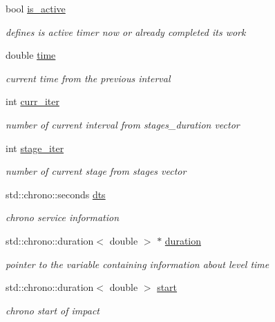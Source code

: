 \begin{DoxyCompactItemize}
bool \hyperlink{class_timer_a6f1066d49764f5fc746f5fd669d95a9f}{is\+\_\+active}
\begin{DoxyCompactList}\small\item\em defines is active timer now or already completed its work \end{DoxyCompactList}\item 
\mbox{\label{class_timer_aa410e9f94d1cdb79090fcf159f8f4d8c}} 
double \hyperlink{class_timer_aa410e9f94d1cdb79090fcf159f8f4d8c}{time}
\begin{DoxyCompactList}\small\item\em current time from the previous interval \end{DoxyCompactList}\item 
\mbox{\label{class_timer_ae5b386341474f4cb8f11227e884250ab}} 
int \hyperlink{class_timer_ae5b386341474f4cb8f11227e884250ab}{curr\+\_\+iter}
\begin{DoxyCompactList}\small\item\em number of current interval from stages\+\_\+duration vector \end{DoxyCompactList}\item 
\mbox{\label{class_timer_a34caee928e5a02b075496a74329abaeb}} 
int \hyperlink{class_timer_a34caee928e5a02b075496a74329abaeb}{stage\+\_\+iter}
\begin{DoxyCompactList}\small\item\em number of current stage from stages vector \end{DoxyCompactList}\item 
\mbox{\label{class_timer_a196651dd936adea933d014145a9ae38e}} 
std\+::chrono\+::seconds \hyperlink{class_timer_a196651dd936adea933d014145a9ae38e}{dts}
\begin{DoxyCompactList}\small\item\em chrono service information \end{DoxyCompactList}\item 
\mbox{\label{class_timer_adbfe2ce4f502d555df6468e551a00f93}} 
std\+::chrono\+::duration$<$ double $>$ $\ast$ \hyperlink{class_timer_adbfe2ce4f502d555df6468e551a00f93}{duration}
\begin{DoxyCompactList}\small\item\em pointer to the variable containing information about level time \end{DoxyCompactList}\item 
\mbox{\label{class_timer_a9ad79c94db842e09125f74e776fa784a}} 
std\+::chrono\+::duration$<$ double $>$ \hyperlink{class_timer_a9ad79c94db842e09125f74e776fa784a}{start}
\begin{DoxyCompactList}\small\item\em chrono start of impact \end{DoxyCompactList}\end{DoxyCompactItemize}


